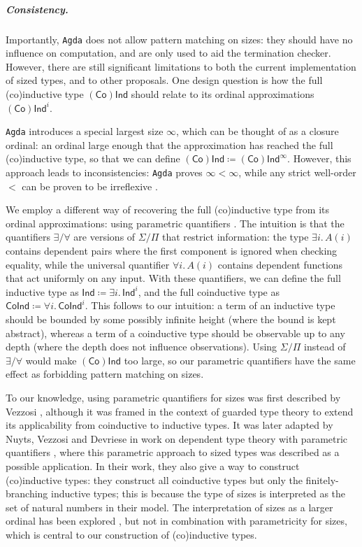\documentclass[10pt,a4paper]{article}
\theoremstyle{definition}
\theoremstyle{remark}
\renewcommand{\.}{.\,} %
\renewcommand{\:}{:} %
\newcommand{\0}{\mathbf{0}}
\newcommand{\1}{\mathbf{1}}
\newcommand\<\langle
\renewcommand\>\rangle
\renewcommand\sf\mathsf
\theoremstyle{remark}
\begin{document}
\subparagraph*{Consistency.}
Importantly, \texttt{Agda} does not allow pattern matching on sizes: they should have no influence on computation, and are only used to aid the termination checker.
However, there are still significant limitations to both the current implementation of sized types, and to other proposals.
One design question is how the full (co)inductive type \((\sf{Co})\sf{Ind}\) should relate to its ordinal approximations \((\sf{Co})\sf{Ind}^i\).

\texttt{Agda} introduces a special largest size $\infty$, which can be thought of as a closure ordinal: an ordinal large enough that the approximation has reached the full (co)inductive type, so that we can define \((\sf{Co})\sf{Ind}\coloneqq (\sf{Co})\sf{Ind}^\infty\).
However, this approach leads to inconsistencies: \texttt{Agda} proves \(\infty<\infty\), while any strict well-order \(<\) can be proven to be irreflexive \cite{agda-issue-3026}.

We employ a different way of recovering the full (co)inductive type from its ordinal approximations: using parametric quantifiers \cite{reynolds1983types, parametric-quantifier, reldtt}.
The intuition is that the quantifiers \(\exists/\forall\) are versions of \(\Sigma/\Pi\) that restrict information: the type \(\exists i.\,A(i)\) contains dependent pairs where the first component is ignored when checking equality, while the universal quantifier \(\forall i.\,A(i)\) contains dependent functions that act uniformly on any input.
With these quantifiers, we can define the full inductive type as \(\sf{Ind}\coloneqq\exists i.\,\sf{Ind}^i\), and the full coinductive type as \(\sf{CoInd}\coloneqq\forall i.\,\sf{CoInd}^i\).
This follows to our intuition: a term of an inductive type should be bounded by some possibly infinite height (where the bound is kept abstract), whereas a term of a coinductive type should be observable up to any depth (where the depth does not influence observations). 
Using \(\Sigma/\Pi\) instead of \(\exists/\forall\) would make \((\sf{Co})\sf{Ind}\) too large, so our parametric quantifiers have the same effect as forbidding pattern matching on sizes.

To our knowledge, using parametric quantifiers for sizes was first described by Vezzosi \cite{licentiate}, although it was framed in the context of guarded type theory \cite{nakano,prod-coprogramming} to extend its applicability from coinductive to inductive types.
It was later adapted by Nuyts, Vezzosi and Devriese in work on dependent type theory with parametric quantifiers \cite{parametric-quantifier, reldtt}, where this parametric approach to sized types was described as a possible application. In their work, they also give a way to construct (co)inductive types: they construct all coinductive types but only the finitely-branching inductive types; this is because the type of sizes is interpreted as the set of natural numbers in their model.
The interpretation of sizes as a larger ordinal has been explored \cite{Abel2006TypebasedTA, Chan_2022}, but not in combination with parametricity for sizes, which is central to our construction of (co)inductive types.
\end{document}
